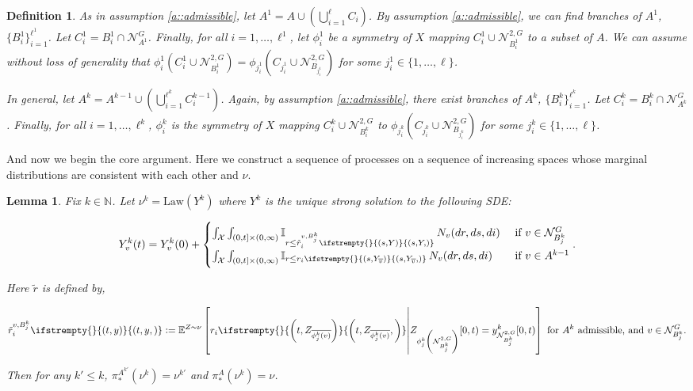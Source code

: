 \documentclass[12pt]{article}
\newcommand{\mb}{\mathbb}
\newcommand{\mc}{\mathcal}
\newcommand{\ov}{\overline}
\newcommand{\te}{\text}
\newcommand{\ind}{\hspace{24pt}}
\newcommand{\exmu}[2]{\mb{E}^{#1}\left[#2\right]}	%
\newcommand{\defeq}{:=}								%
\newcommand{\sta}{\mc{X}}							%
\newcommand{\gneigh}[2]{\mc{N}^{#1}_{#2}}			%
\newcommand{\dgneigh}[2]{\mc{N}^{2,#1}_{#2}}		%
\newcommand{\cl}[1]{\ov{#1}}						%
\newcommand{\indx}[1]{^{#1}}						%
\newcommand{\Xf}{X}									%
\newcommand{\poiss}{N}								%
\newcommand{\Sm}{\ell}								%
\newcommand{\rate}{r}								%
\newcommand{\proj}{\pi}								%
\newcommand{\xg}{y}									%
\newcommand{\poissv}[1]{_{#1}}						%
\newcommand{\vind}[1]{_{#1}}						%
\newcommand{\tme}[1]{(#1)}							%
\newcommand{\tmi}[1]{#1}							%
\newcommand{\vpara}[1]{^{#1}}						%
\newcommand{\stpara}[1]{_{#1}}						%
\newcommand{\psf}{_*}								%
\newcommand{\tmepro}[3]{
\ifstrempty{#3}{
	\left(#1,#2\right)}{
	\left(#1,#2,#3\right)}}							%
\newcommand{\Xg}{Y}									%
\newcommand{\brate}{\alt{\rate}}					%
\newcommand{\alt}[1]{\tilde{#1}}					%
\newcommand{\mm}{\nu}								%
\newcommand{\law}{\te{Law}}							%
\newcommand{\Xh}{Z}									%
\newcommand{\vjpara}[2]{^{#1,#2}}					%
\newtheorem{lem}[thms]{Lemma}
\newtheorem{defn}[thms]{Definition}
\begin{document}
\begin{defn}
As in assumption \ref{a::admissible}, let \(A\indx{1} = A\cup\left(\bigcup_{i=1}^\Sm C_i\right)\). By assumption \ref{a::admissible}, we can find branches of \(A\indx{1}\), \(\{B_i\indx{1}\}_{i=1}^{\Sm\indx{1}}\). Let \(C_i\indx{1} = B_i\indx{1}\cap\gneigh{G}{A\indx{1}}\). Finally, for all \(i = 1,\dots,\Sm\indx{1}\), let \(\phi_i\indx{1}\) be a symmetry of \(\Xf\) mapping \(C_i\indx{1}\cup \dgneigh{G}{B\indx{1}_i}\) to a subset of \(A\). We can assume without loss of generality that \(\phi_i\indx{1}(C_i\indx{1}\cup \dgneigh{G}{B\indx{1}_i}) = \phi_{j\indx{1}_i}(C_{j\indx{1}_i}\cup\dgneigh{G}{B_{j\indx{1}_i}})\) for some \(j\indx{1}_i \in \{1,\dots,\Sm\}\).

\ind In general, let \(A\indx{k} = A\indx{k-1} \cup \left(\bigcup_{i=1}^{\Sm\indx{k}} C_i\indx{k-1}\right)\). Again, by assumption \ref{a::admissible}, there exist branches of \(A\indx{k}\), \(\{B_i\indx{k}\}_{i=1}^{\Sm\indx{k}}\). Let \(C_i\indx{k} = B_i\indx{k}\cap \gneigh{G}{A\indx{k}}\). Finally, for all \(i=1,\dots,\Sm\indx{k}\), \(\phi_i\indx{k}\) is the symmetry of \(\Xf\) mapping \(C_i\indx{k}\cup\dgneigh{G}{B_i\indx{k}}\) to \(\phi_{j\indx{k}_i}(C_{j\indx{k}_i}\cup\dgneigh{G}{B_{j\indx{k}_i}})\) for some \(j\indx{k}_i \in \{1,\dots,\Sm\}\).
\label{Uq::Extnot}
\end{defn}

And now we begin the core argument. Here we construct a sequence of processes on a sequence of increasing spaces whose marginal distributions are consistent with each other and \(\mm\).

\begin{lem}
Fix \(k \in \mb{N}\). Let \(\mm\indx{k} = \law(\Xg\indx{k})\) where \(\Xg\indx{k}\) is the unique strong solution to the following SDE:

\begin{equation}
\Xg\indx{k}\vind{v}\tme{t} = \Xg\indx{k}\vind{v}\tme{0} + 
\begin{cases}
\int_\sta\int_{(0,t]\times(0,\infty)} \mb{I}_{r \leq \brate\vjpara{v}{B\indx{k}_j}\stpara{i}\tmepro{s}{\Xg}{}}\,\poiss\poissv{v}(dr,ds,di) &\te{ if } v \in \gneigh{G}{B\indx{k}_j}\\
\int_\sta\int_{(0,t]\times(0,\infty)} \mb{I}_{r \leq \rate\stpara{i}\tmepro{s}{\Xg\vind{\cl{v}}}{}}\,\poiss\poissv{v}(dr,ds,di) &\te{ if } v \in A\indx{k-1}
\end{cases}.
\label{Uq::exteqn}
\end{equation}

Here \(\brate\) is defined by,

\[\brate\vjpara{v}{B\indx{k}_j}\stpara{i}\tmepro{t}{\xg}{} \defeq \exmu{\Xh\sim \mm}{\rate\stpara{i}\tmepro{t}{\Xh\vind{\cl{\phi_j\indx{k}(v)}}}{}\middle|\Xh\vind{\phi_j\indx{k}\left(\dgneigh{G}{B\indx{k}_j}\right)}\tmi{[0,t)} = \xg\indx{k}\vind{\dgneigh{G}{B\indx{k}_j}}\tmi{[0,t)}} \te{ for } A\indx{k}\te{ admissible, and } v \in \gneigh{G}{B\indx{k}_j}.\]

Then for any \(k' \leq k\), \(\proj\psf\vpara{A\indx{k'}}(\mm\indx{k}) = \mm\indx{k'}\) and \(\proj\psf\vpara{A}(\mm\indx{k}) = \mm\).
\label{Uq::ext}
\end{lem}
\end{document}
